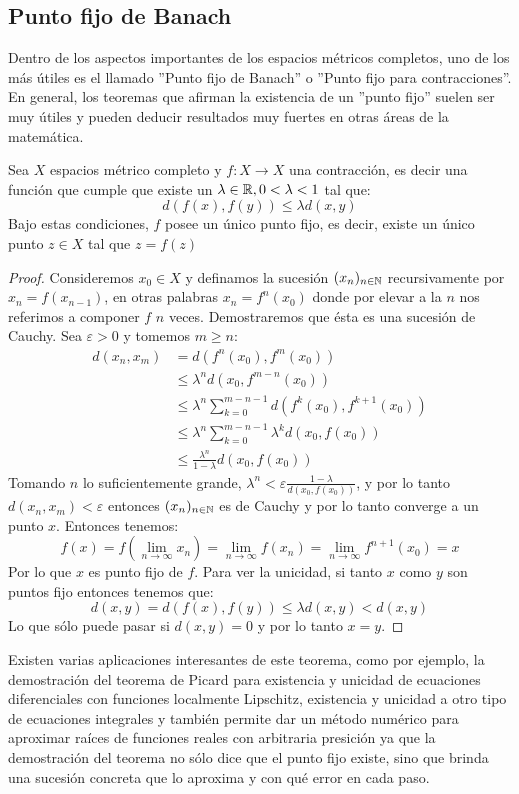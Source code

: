 \documentclass[12pt,a4paper]{book}
\begin{document}
\subsection{Punto fijo de Banach}
Dentro de los aspectos importantes de los espacios métricos completos, uno de los más útiles es el llamado ''Punto fijo de Banach'' o ''Punto fijo para contracciones''. En general, los teoremas que afirman la existencia de un ''punto fijo'' suelen ser muy útiles y pueden deducir resultados muy fuertes en otras áreas de la matemática.
\begin{teo}
Sea $X$ espacios métrico completo y $f:X \rightarrow X$ una contracción, es decir una función que cumple que existe un $\lambda \in \mathbb{R}, 0<\lambda<1$ tal que:
$$ d(f(x),f(y)) \leq \lambda d(x,y)$$
Bajo estas condiciones, $f$ posee un único punto fijo, es decir, existe un único punto $z \in X$ tal que $z = f(z)$
\begin{proof}
Consideremos $x_0 \in X$ y definamos la sucesión $(x_n)_{{n} \in \mathbb{N}}$ recursivamente por $x_n = f(x_{n-1})$, en otras palabras $x_n = f^n(x_0)$ donde por elevar a la $n$ nos referimos a componer $f$ $n$ veces. Demostraremos que ésta es una sucesión de Cauchy. Sea $\varepsilon > 0$ y tomemos $m \geq n$:
\begin{align*}
d(x_n,x_m) &= d(f^n(x_0),f^m(x_0)) \\
 &\leq \lambda^n d(x_0, f^{m-n}(x_0)) \\
 &\leq \lambda^n \sum_{k=0}^{m-n-1} d(f^k(x_0),f^{k+1}(x_0)) \\
 &\leq \lambda^n \sum_{k=0}^{m-n-1} \lambda^k d(x_0,f(x_0)) \\
 &\leq \frac{\lambda^n}{1 - \lambda} d(x_0,f(x_0)) 
\end{align*}
Tomando $n$ lo suficientemente grande, $ \lambda^n < \varepsilon \frac{1- \lambda}{d(x_0,f(x_0))}$, y por lo tanto $d(x_n,x_m)< \varepsilon$ entonces $(x_n)_{{n} \in \mathbb{N}}$ es de Cauchy y por lo tanto converge a un punto $x$. Entonces tenemos:
$$f(x) = f(\lim_{n \to \infty} x_n) = \lim_{n \to \infty} f(x_n) = \lim_{n \to \infty} f^{n+1}(x_0) = x$$
Por lo que $x$ es punto fijo de $f$. Para ver la unicidad, si tanto $x$ como $y$ son puntos fijo entonces tenemos que:
$$ d(x,y)=d(f(x),f(y)) \leq \lambda d(x,y) < d(x,y)$$
Lo que sólo puede pasar si $d(x,y)=0$ y por lo tanto $x=y$.
\end{proof}
\end{teo}
Existen varias aplicaciones interesantes de este teorema, como por ejemplo, la demostración del teorema de Picard para existencia y unicidad de ecuaciones diferenciales con funciones localmente Lipschitz, existencia y unicidad a otro tipo de ecuaciones integrales y también permite dar un método numérico para aproximar raíces de funciones reales con arbitraria presición ya que la demostración del teorema no sólo dice que el punto fijo existe, sino que brinda una sucesión concreta que lo aproxima y con qué error en cada paso.
\end{document}
